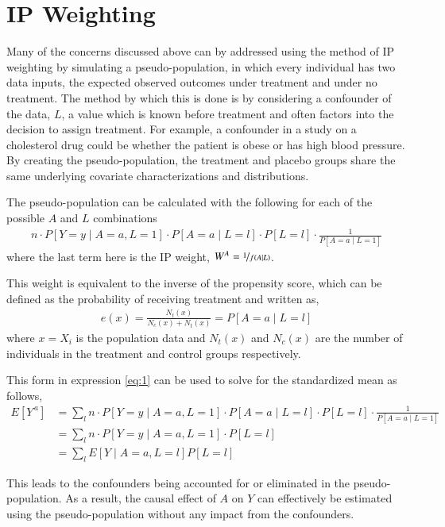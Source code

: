 \section{IP Weighting} \label{IP Weighting} 
Many of the concerns discussed above can by addressed using the method of IP weighting by simulating a pseudo-population, in which every individual has two data inputs, the expected observed outcomes under treatment and under no treatment.  The method by which this is done is by considering a confounder of the data, $L$, a value which is known before treatment and often factors into the decision to assign treatment.  For example, a confounder in a study on a cholesterol drug could be whether the patient is obese or has high blood pressure.  By creating the pseudo-population, the treatment and placebo groups share the same underlying covariate characterizations and distributions. 

The pseudo-population can be calculated with the following for each of the possible $A$ and $L$ combinations 
\begin{align} \label{eq:1}
n\cdot P[Y=y \mid A = a, L= 1] \cdot P[A=a \mid L=l]  \cdot P[L=l] \cdot \frac{1}{P[A = a \mid L = 1]} \end{align}  
where the last term here is the IP weight, $W^{A} = \nicefrac{1}{f(A\mid L)}$.  

This weight is equivalent to the inverse of the propensity score, which can be defined as the probability of receiving treatment and written as,\cite{imbens2015causal}
\begin{align} 
e(x) = \frac{N_t(x)}{N_c(x) + N_t(x)} = P[A=a \mid L = l] 
\end{align} 
where $x = X_i$ is the population data and $N_t(x)$ and $N_c (x)$ are the number of individuals in the treatment and control groups respectively.  

This form in expression \ref{eq:1} can be used to solve for the standardized mean as follows, 
\begin{align} 
E[Y^{\,a}] &= \sum_l n \cdot P[Y=y \mid A = a, L= 1] \cdot P[A=a \mid L=l]  \cdot P[L=l] \cdot \frac{1}{P[A = a \mid L = 1]} \\ 
&=  \sum_l n \cdot P[Y=y \mid A = a, L= 1] \cdot P[L=l]\\ 
&= \sum_l E[Y \mid A=a, L= l] P[L=l] 
\end{align} 

This leads to the confounders being accounted for or eliminated in the pseudo-population.  As a result, the causal effect of $A$ on $Y$ can effectively be estimated using the pseudo-population without any impact from the confounders.  


